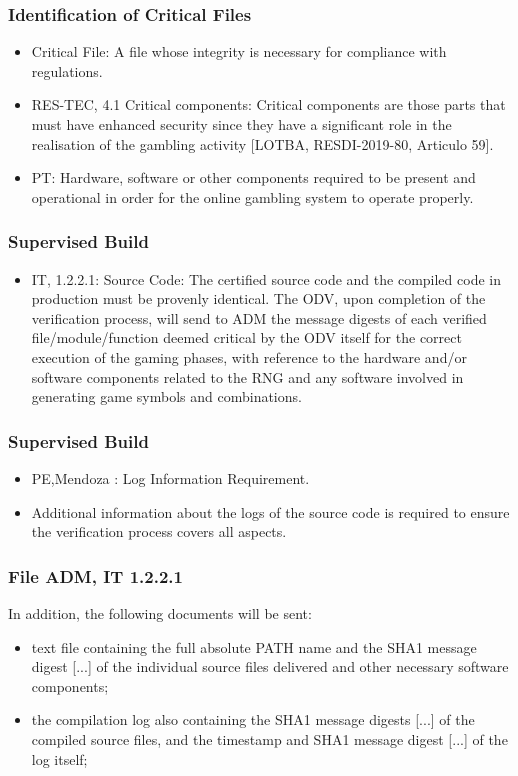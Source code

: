 \documentclass{beamer}
\begin{document}
\begin{frame}
\frametitle{Identification of Critical Files}
\begin{itemize}
\item<1-> Critical File: A file whose integrity is necessary for compliance with regulations.
\item<2-> RES-TEC, 4.1 Critical components: Critical components are those parts that must have enhanced security since they have a significant role in the realisation of the gambling activity [LOTBA, RESDI-2019-80, Articulo 59].
\item<3-> PT: Hardware, software or other components required to be present and operational in order for the online gambling system to operate properly.
\end{itemize}
\end{frame}

\begin{frame}
\frametitle{Supervised Build}
\begin{itemize}
\item<1->IT, 1.2.2.1: Source Code: The certified source code and the compiled code in production must be provenly identical. The ODV, upon completion of the verification process, will send to ADM the message digests of each verified file/module/function deemed critical by the ODV itself for the correct execution of the gaming phases, with reference to the hardware and/or software components related to the RNG and any software involved in generating game symbols and combinations.
\end{itemize}
\end{frame}

\begin{frame}
\frametitle{Supervised Build}
\begin{itemize}
\item<1->PE,Mendoza : Log Information Requirement.
\item<1->Additional information about the logs of the source code is required to ensure the verification process covers all aspects.
\end{itemize}
\end{frame}

\begin{frame}
\frametitle{File ADM, IT 1.2.2.1}
In addition, the following documents will be sent:
\begin{itemize}
\item<1->  text file containing the full absolute PATH name and the SHA1 message digest [...] of the individual source files delivered and other necessary software components;
\item<1-> the compilation log also containing the SHA1 message digests [...] of the compiled source files, and the timestamp and SHA1 message digest [...] of the log itself;
\end{itemize}
\end{frame}
\end{document}
